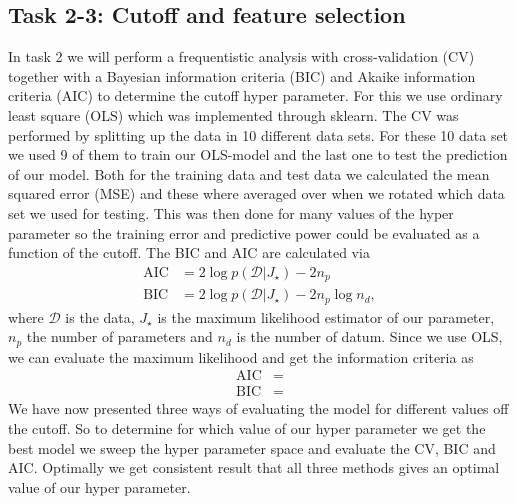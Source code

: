 \documentclass[11pt,a4paper]{article}
\begin{document}
\subsection[Task 1]{Task 2-3: Cutoff and feature selection}
\label{sec:task23}

In task 2 we will perform a frequentistic analysis with cross-validation (CV) together with a Bayesian information criteria (BIC) and Akaike information criteria (AIC) to determine the cutoff hyper parameter. For this we use ordinary least square (OLS) which was implemented through sklearn. The CV was performed by splitting up the data in 10 different data sets. For these 10 data set we used 9 of them to train our OLS-model and the last one to test the prediction of our model. Both for the training data and test data we calculated the mean squared error (MSE) and these where averaged over when we rotated which data set we used for testing. This was then done for many values of the hyper parameter so the training error and predictive power could be evaluated as a function of the cutoff. The BIC and AIC are calculated via
\begin{equation*}
\begin{split}
    \text{AIC} &= 2 \log{p\left(\mathcal{D} \vert J_{\star} \right)} - 2n_p \\
    \text{BIC} &= 2 \log{p\left(\mathcal{D} \vert J_{\star} \right)} - 2n_p \log{n_d},
\end{split}
\end{equation*}
where $\mathcal{D}$ is the data, $J_\star$ is the maximum likelihood estimator of our parameter, $n_p$ the number of parameters and $n_d$ is the number of datum. Since we use OLS, we can evaluate the maximum likelihood and get the information criteria as 
\begin{equation*}
\begin{split}
    \text{AIC} &= \\
    \text{BIC} &=
\end{split}
\end{equation*}
We have now presented three ways of evaluating the model for different values off the cutoff. So to determine for which value of our hyper parameter we get the best model we sweep the hyper parameter space and evaluate the CV, BIC and AIC. Optimally we get consistent result that all three methods gives an optimal value of our hyper parameter. 
\end{document}
